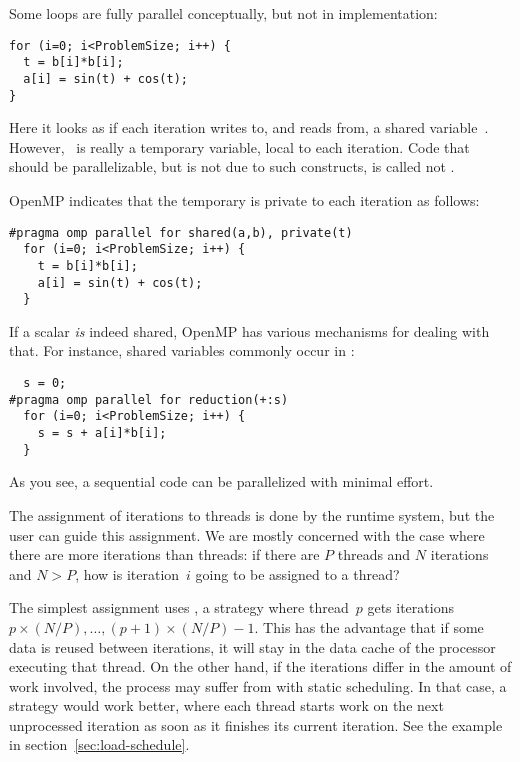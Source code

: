 Some loops are fully parallel conceptually, but not in implementation:
\lstset{language=C}
\begin{lstlisting}
for (i=0; i<ProblemSize; i++) {
  t = b[i]*b[i];
  a[i] = sin(t) + cos(t);
}
\end{lstlisting}
Here it looks as if each iteration writes to, and reads from, a shared
variable~. However, ~is really a temporary variable,
local to each iteration. Code that should be parallelizable, but is
not due to such constructs, is called not .

OpenMP indicates that the temporary is private to each iteration as follows:
\lstset{language=C}
\begin{lstlisting}
#pragma omp parallel for shared(a,b), private(t)
  for (i=0; i<ProblemSize; i++) {
    t = b[i]*b[i];
    a[i] = sin(t) + cos(t);
  }
\end{lstlisting}
If a scalar \emph{is} indeed shared, OpenMP has various mechanisms for
dealing with that. For instance, shared variables commonly occur in
:
\lstset{language=C}
\begin{lstlisting}
  s = 0;
#pragma omp parallel for reduction(+:s)
  for (i=0; i<ProblemSize; i++) {
    s = s + a[i]*b[i];
  }
\end{lstlisting}
As you see, a sequential code can be parallelized with minimal effort.

The assignment of iterations to threads is done by the runtime system,
but the user can guide this assignment. We are mostly concerned with
the case where there are more iterations than threads: if there are
$P$ threads and $N$ iterations and $N>P$, how is iteration~$i$ going
to be assigned to a thread?

The simplest assignment uses , a
 strategy where thread~$p$ gets iterations
$p\times(N/P),\ldots,(p+1)\times (N/P)-1$.
This has the advantage that if some data is
reused between iterations, it will stay in the data cache of the
processor executing that thread. On the other hand, if the iterations
differ in the amount of work involved, the process may suffer from
 with static scheduling. In that case, a
 strategy would work better, where each
thread starts work on the next unprocessed iteration as soon as it
finishes its current iteration. See the example in section~\ref{sec:load-schedule}.

